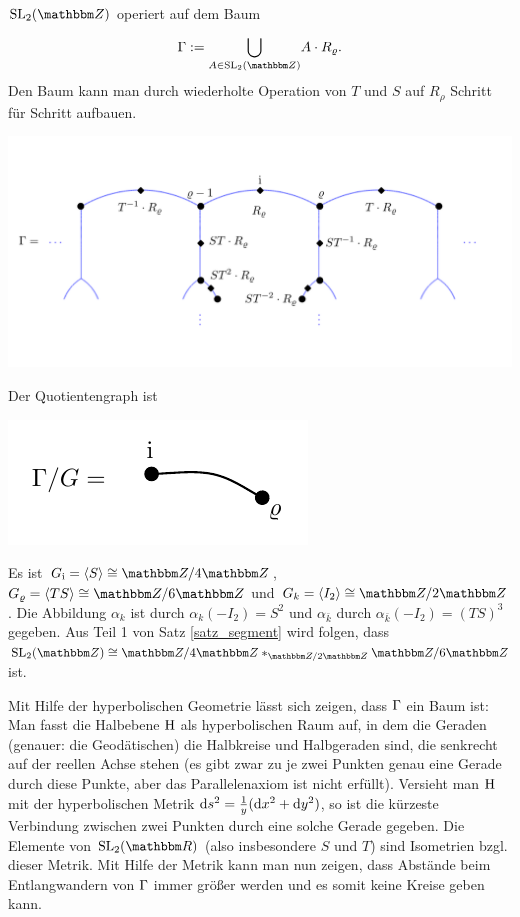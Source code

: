 \documentclass[a4paper, 12pt, twoside]{article}
\begin{document}
\begin{enumerate}
$\SL_2(\ZZ)$ operiert auf dem Baum
\[
\GR := \BCUP{}{A\in\SL_2(\ZZ)} A\cdot R_{\rho}.
\]
Den Baum kann man durch wiederholte Operation von $T$ und $S$
auf $R_{\rho}$ Schritt für Schritt aufbauen.
\begin{center}
	\includegraphics[width=15cm]{grugraImages/Hbaum}
\end{center}
Der Quotientengraph ist
\begin{center}
	\includegraphics{grugraImages/rhoquot}
\end{center}
Es ist $G_{\i}=\lag S\rag \cong \ZZ/4\ZZ$,
$G_{\rho}=\lag TS\rag\cong \ZZ/6\ZZ$ und
$G_k=\lag I_2\rag \cong\ZZ/2\ZZ$.
Die Abbildung $\alpha_k$ ist durch $\alpha_k(-I_2)=S^2$ und
$\alpha_{\bar{k}}$ durch
$\alpha_{\bar{k}}(-I_2)=(TS)^3$ gegeben.
Aus Teil 1 von Satz \ref{satz_segment} wird folgen,
dass $\SL_2(\ZZ)\cong \ZZ/4\ZZ*_{\ZZ/2\ZZ} \ZZ/6\ZZ$ ist.

Mit Hilfe der hyperbolischen Geometrie lässt sich zeigen, dass
$\Gamma$ ein Baum ist:\\
Man fasst die Halbebene $\mathrm{H}$ als hyperbolischen Raum auf, in dem
die Geraden (genauer: die Geodätischen) die Halbkreise und Halbgeraden
sind, die senkrecht auf der reellen Achse stehen (es gibt zwar
zu je zwei Punkten genau eine Gerade durch diese Punkte, aber
das Parallelenaxiom ist nicht erfüllt).
Versieht man $\mathrm{H}$ mit der hyperbolischen Metrik
$\mathrm{d} s^2 = \frac{1}{y}(\mathrm{d} x^2 + \mathrm{d} y^2)$, so ist die kürzeste
Verbindung zwischen zwei Punkten durch eine solche Gerade gegeben.
Die Elemente von $\SL_2(\RR)$ (also insbesondere $S$ und $T$) sind
Isometrien bzgl. dieser Metrik. Mit Hilfe der Metrik kann man nun
zeigen, dass Abstände beim Entlangwandern von $\Gamma$ immer größer
werden und es somit keine Kreise geben kann.
\end{enumerate}
\end{document}
